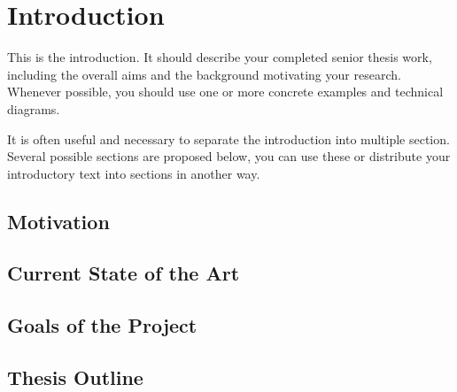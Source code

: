 \chapter{Introduction}
\label{ch:intro}

This is the introduction. It should describe your completed senior thesis work, including the overall aims and the background motivating your research. Whenever possible, you should use one or more concrete examples
and technical diagrams. 

It is often useful and necessary to separate the introduction into multiple section. Several possible sections are proposed below, you can use these or distribute your introductory text into sections in another way. 

\section{Motivation} 
\label{sec:motivation}

\section{Current State of the Art}
\label{sec:stateofart}

\section{Goals of the Project}
\label{sec:goals}

\section{Thesis Outline}
\label{sec:outline}